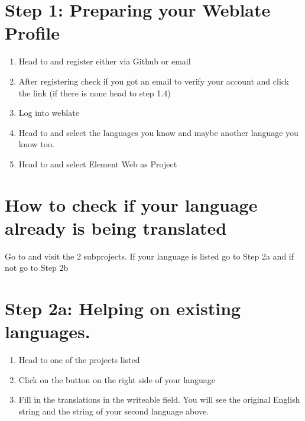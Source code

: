 \documentclass[letterpaper,10pt,openany,oneside,english]{sphinxmanual}
\begin{document}
\chapter{Step 1: Preparing your Weblate Profile}
\label{\detokenize{translating:step-1-preparing-your-weblate-profile}}\begin{enumerate}
%
\item {} 
\sphinxAtStartPar
Head to  and register either via Github or email

\item {} 
\sphinxAtStartPar
After registering check if you got an email to verify your account and click the link (if there is none head to step 1.4)

\item {} 
\sphinxAtStartPar
Log into weblate

\item {} 
\sphinxAtStartPar
Head to  and select the languages you know and maybe another language you know too.

\item {} 
\sphinxAtStartPar
Head to  and select Element Web as Project

\end{enumerate}


\chapter{How to check if your language already is being translated}
\label{\detokenize{translating:how-to-check-if-your-language-already-is-being-translated}}
\sphinxAtStartPar
Go to  and visit the 2 sub\sphinxhyphen{}projects.
If your language is listed go to Step 2a and if not go to Step 2b


\chapter{Step 2a: Helping on existing languages.}
\label{\detokenize{translating:step-2a-helping-on-existing-languages}}\begin{enumerate}
%
\item {} 
\sphinxAtStartPar
Head to one of the projects listed 

\item {} 
\sphinxAtStartPar
Click on the  button on the right side of your language

\item {} 
\sphinxAtStartPar
Fill in the translations in the writeable field. You will see the original English string and the string of your second language above.

\end{enumerate}
\end{document}
